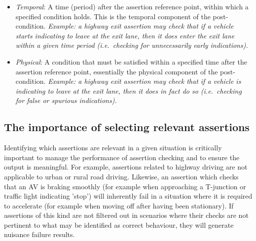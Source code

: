\begin{itemize}
    \begin{itemize}
        \item \textit{Temporal}: A time (period) after the assertion reference point, within which a specified condition holds. This is the temporal component of the post-condition. %
        \textit{Example: a highway exit assertion may check that if a vehicle starts indicating to leave at the exit lane, then it does enter the exit lane within a given time period (i.e.\ checking for unnecessarily early indications).}
        \item \textit{Physical}: A condition that must be satisfied within a specified time after the assertion reference point, essentially the physical component of the post-condition. %
        \textit{Example: a highway exit  assertion may check that if a vehicle is indicating to leave at the exit lane, then it does in fact do so (i.e.\ checking for false or spurious indications).}
    \end{itemize}
\end{itemize}

\subsection{The importance of selecting relevant assertions} \label{assertion_triggers}
Identifying which assertions are relevant in a given situation is critically important to manage the performance of assertion checking and to ensure the output is meaningful. 
%
%
For example, assertions related to highway driving are not applicable to urban or rural road driving.
Likewise, an assertion which checks that an AV is braking smoothly (for example when approaching a T-junction or traffic light indicating 'stop') will inherently fail in a situation where it is required to accelerate (for example when moving off after having been stationary). If assertions of this kind are not filtered out in scenarios where their checks are not pertinent to what may be identified as correct behaviour, they will generate nuisance failure results. 


